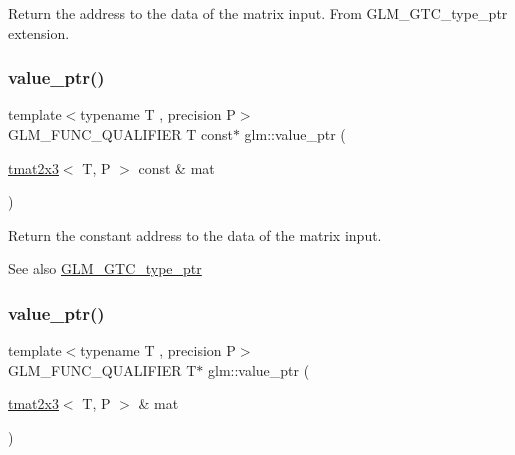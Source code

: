 Return the address to the data of the matrix input. From G\+L\+M\+\_\+\+G\+T\+C\+\_\+type\+\_\+ptr extension. \mbox{\label{group__gtc__type__ptr_ga968f2c8899914ea1c1daaaded8daa6b5}} 
\subsubsection{\texorpdfstring{value\+\_\+ptr()}{value\_ptr()}\hspace{0.1cm}{\footnotesize\ttfamily [14/27]}}
{\footnotesize\ttfamily template$<$typename T , precision P$>$ \\
G\+L\+M\+\_\+\+F\+U\+N\+C\+\_\+\+Q\+U\+A\+L\+I\+F\+I\+ER T const$\ast$ glm\+::value\+\_\+ptr (\begin{DoxyParamCaption}\item[{\hyperlink{structglm_1_1tmat2x3}{tmat2x3}$<$ T, P $>$ const \&}]{mat }\end{DoxyParamCaption})}

Return the constant address to the data of the matrix input. \begin{DoxySeeAlso}{See also}
\hyperlink{group__gtc__type__ptr}{G\+L\+M\+\_\+\+G\+T\+C\+\_\+type\+\_\+ptr} 
\end{DoxySeeAlso}
\mbox{\label{group__gtc__type__ptr_ga36fb9a17664c8b6848a5d005e4068a2f}} 
\subsubsection{\texorpdfstring{value\+\_\+ptr()}{value\_ptr()}\hspace{0.1cm}{\footnotesize\ttfamily [15/27]}}
{\footnotesize\ttfamily template$<$typename T , precision P$>$ \\
G\+L\+M\+\_\+\+F\+U\+N\+C\+\_\+\+Q\+U\+A\+L\+I\+F\+I\+ER T$\ast$ glm\+::value\+\_\+ptr (\begin{DoxyParamCaption}\item[{\hyperlink{structglm_1_1tmat2x3}{tmat2x3}$<$ T, P $>$ \&}]{mat }\end{DoxyParamCaption})}

